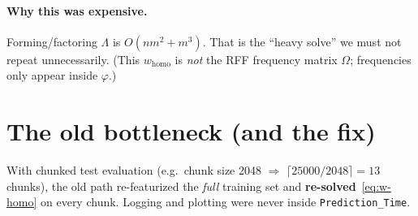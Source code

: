 \documentclass[11pt]{article}
\newcommand{\homo}{w_{\mathrm{homo}}}
\newcommand{\phistar}{\varphi}
\begin{document}
\paragraph{Why this was expensive.}
Forming/factoring $\Lambda$ is $O(n m^2+m^3)$. That is the ``heavy solve'' we
must not repeat unnecessarily. (This $\homo$ is \emph{not} the RFF frequency matrix
$\Omega$; frequencies only appear inside $\phistar$.)

\section{The old bottleneck (and the fix)}

With chunked test evaluation (e.g.\ chunk size 2048 $\Rightarrow$
$\lceil 25000/2048\rceil=13$ chunks), the old path re-featurized the \emph{full}
training set and \textbf{re-solved}~\eqref{eq:w-homo} on every chunk. Logging and
plotting were never inside \texttt{Prediction\_Time}.
\end{document}
